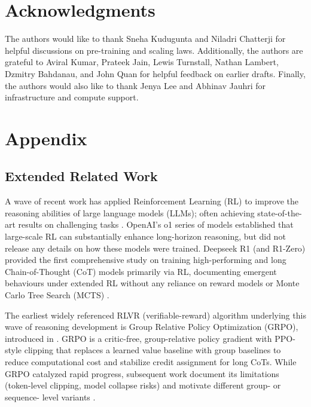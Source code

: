 \documentclass[]{fairmeta} %
\begin{document}
\section{Acknowledgments}
The authors would like to thank Sneha Kudugunta and Niladri Chatterji for helpful discussions on pre-training and scaling laws. Additionally, the authors are grateful to Aviral Kumar, Prateek Jain, Lewis Turnstall, Nathan Lambert, Dzmitry Bahdanau, and John Quan for helpful feedback on earlier drafts. Finally, the authors would also like to thank Jenya Lee and Abhinav Jauhri for infrastructure and compute support.




\appendix
\newpage
\section{Appendix}

\subsection{Extended Related Work}\label{appendix:related}

A wave of recent work has applied Reinforcement Learning (RL) to improve the reasoning abilities of large language models (LLMs); often achieving state-of-the-art results on challenging tasks \citep{openai-o1, guo2025deepseek, seed2025seed1, carbonneaux2025cwm}. OpenAI's o1 series of models established that large-scale RL can substantially enhance long-horizon reasoning, but did not release any details on how these models were trained. Deepseek R1 (and R1-Zero) \citep{guo2025deepseek} provided the first comprehensive study on training high-performing and long Chain-of-Thought (CoT) models primarily via RL, documenting emergent behaviours under extended RL without any reliance on reward models \citep{lightman2023let} or Monte Carlo Tree Search (MCTS) \citep{xie2024monte}.

The earliest widely referenced RLVR (verifiable-reward) algorithm underlying this wave of reasoning development is Group Relative Policy Optimization (GRPO), introduced in \citet{shao2024deepseekmath}. GRPO is a critic-free, group-relative policy gradient with PPO-style clipping that replaces a learned value baseline with group baselines to reduce computational cost and stabilize credit assignment for long CoTs. While GRPO catalyzed rapid progress, subsequent work document its limitations (token-level clipping, model collapse risks) and motivate different group- or sequence- level variants \citep{yu2025dapo, yue2025vapo, hu2025open, gspo}.
\end{document}
